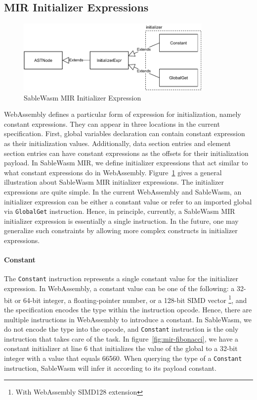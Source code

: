\subsection{MIR Initializer Expressions}

\begin{figure}
  \centering
  \includegraphics[width=0.85\textwidth]{Images/4.MIR/initalizer-expression.pdf}
  \caption{SableWasm MIR Initializer Expression}
  \label{fig:sablewasm-mir-initializer-expression}
\end{figure}

WebAssembly defines a particular form of expression for initialization, namely
constant expressions. They can appear in three locations in the current
specification. First, global variables declaration can contain constant
expression as their initialization values. Additionally, data section entries
and element section entries can have constant expressions as the offsets for
their initialization payload. In SableWasm MIR, we define initializer
expressions that act similar to what constant expressions do in WebAssembly.
Figure~\ref{fig:sablewasm-mir-initializer-expression} gives a general
illustration about SableWasm MIR initializer expressions. The initializer
expressions are quite simple. In the current WebAssembly and SableWasm, an
initializer expression can be either a constant value or refer to an imported
global via \texttt{GlobalGet} instruction. Hence, in principle, currently,
a SableWasm MIR initializer expression is essentially a single instruction. In
the future, one may generalize such constraints by allowing more complex
constructs in initializer expressions.

\paragraph{Constant}
The \texttt{Constant} instruction represents a single constant value for the
initializer expression. In WebAssembly, a constant value can be one of the
following: a 32-bit or 64-bit integer, a floating-pointer number, or a 128-bit
SIMD vector \footnote{With WebAssembly SIMD128 extension}, and the specification
encodes the type within the instruction opcode. Hence, there are multiple
instructions in WebAssembly to introduce a constant. In SableWasm, we do not
encode the type into the opcode, and \texttt{Constant} instruction is the only
instruction that takes care of the task. In figure~\ref{fig:mir-fibonacci}, we
have a constant initializer at line 6 that initializes the value of the global
to a 32-bit integer with a value that equals 66560. When querying the type of a
\texttt{Constant} instruction, SableWasm will infer it according to its payload
constant.

